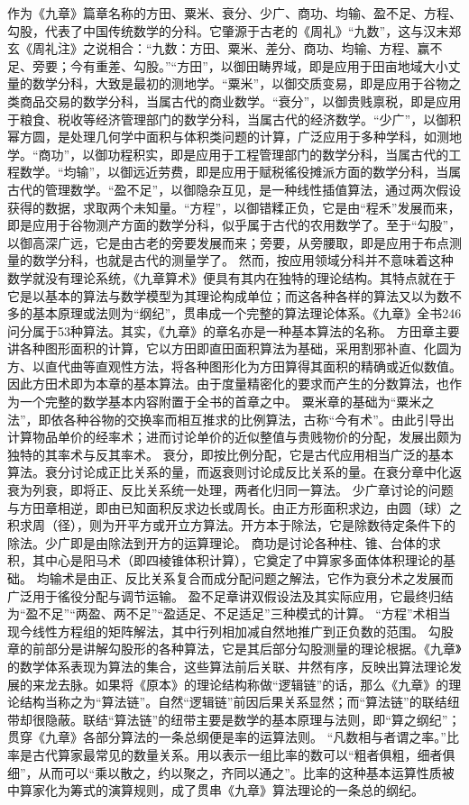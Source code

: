 \documentclass[12pt,UTF8]{ctexbook}
\begin{document}
作为《九章》篇章名称的方田、粟米、衰分、少广、商功、均输、盈不足、方程、勾股，代表了中国传统数学的分科。它肇源于古老的《周礼》“九数”，这与汉末郑玄《周礼注》之说相合：“九数：方田、粟米、差分、商功、均输、方程、赢不足、旁要；今有重差、勾股。”“方田”，以御田畴界域，即是应用于田亩地域大小丈量的数学分科，大致是最初的测地学。“粟米”，以御交质变易，即是应用于谷物之类商品交易的数学分科，当属古代的商业数学。“衰分”，以御贵贱禀税，即是应用于粮食、税收等经济管理部门的数学分科，当属古代的经济数学。“少广”，以御积幂方圆，是处理几何学中面积与体积类问题的计算，广泛应用于多种学科，如测地学。“商功”，以御功程积实，即是应用于工程管理部门的数学分科，当属古代的工程数学。“均输”，以御远近劳费，即是应用于赋税徭役摊派方面的数学分科，当属古代的管理数学。“盈不足”，以御隐杂互见，是一种线性插值算法，通过两次假设获得的数据，求取两个未知量。“方程”，以御错糅正负，它是由“程禾”发展而来，即是应用于谷物测产方面的数学分科，似乎属于古代的农用数学了。至于“勾股”，以御高深广远，它是由古老的旁要发展而来；旁要，从旁腰取，即是应用于布点测量的数学分科，也就是古代的测量学了。
然而，按应用领域分科并不意味着这种数学就没有理论系统，《九章算术》便具有其内在独特的理论结构。其特点就在于它是以基本的算法与数学模型为其理论构成单位；而这各种各样的算法又以为数不多的基本原理或法则为“纲纪”，贯串成一个完整的算法理论体系。《九章》全书246问分属于53种算法。其实，《九章》的章名亦是一种基本算法的名称。
方田章主要讲各种图形面积的计算，它以方田即直田面积算法为基础，采用割邪补直、化圆为方、以直代曲等直观性方法，将各种图形化为方田算得其面积的精确或近似数值。因此方田术即为本章的基本算法。由于度量精密化的要求而产生的分数算法，也作为一个完整的数学基本内容附置于全书的首章之中。
粟米章的基础为“粟米之法”，即依各种谷物的交换率而相互推求的比例算法，古称“今有术”。由此引导出计算物品单价的经率术；进而讨论单价的近似整值与贵贱物价的分配，发展出颇为独特的其率术与反其率术。
衰分，即按比例分配，它是古代应用相当广泛的基本算法。衰分讨论成正比关系的量，而返衰则讨论成反比关系的量。在衰分章中化返衰为列衰，即将正、反比关系统一处理，两者化归同一算法。
少广章讨论的问题与方田章相逆，即由已知面积反求边长或周长。由正方形面积求边，由圆（球）之积求周（径），则为开平方或开立方算法。开方本于除法，它是除数待定条件下的除法。少广即是由除法到开方的运算理论。
商功是讨论各种柱、锥、台体的求积，其中心是阳马术（即四棱锥体积计算），它奠定了中算家多面体体积理论的基础。
均输术是由正、反比关系复合而成分配问题之解法，它作为衰分术之发展而广泛用于徭役分配与调节运输。
盈不足章讲双假设法及其实际应用，它最终归结为“盈不足”“两盈、两不足”“盈适足、不足适足”三种模式的计算。
“方程”术相当现今线性方程组的矩阵解法，其中行列相加减自然地推广到正负数的范围。
勾股章的前部分是讲解勾股形的各种算法，它是其后部分勾股测量的理论根据。《九章》的数学体系表现为算法的集合，这些算法前后关联、井然有序，反映出算法理论发展的来龙去脉。如果将《原本》的理论结构称做“逻辑链”的话，那么《九章》的理论结构当称之为“算法链”。自然“逻辑链”前因后果关系显然；而“算法链”的联结纽带却很隐蔽。联结“算法链”的纽带主要是数学的基本原理与法则，即“算之纲纪”；贯穿《九章》各部分算法的一条总纲便是率的运算法则。
“凡数相与者谓之率。”比率是古代算家最常见的数量关系。用以表示一组比率的数可以“粗者俱粗，细者俱细”，从而可以“乘以散之，约以聚之，齐同以通之”。比率的这种基本运算性质被中算家化为筹式的演算规则，成了贯串《九章》算法理论的一条总的纲纪。
\end{document}
